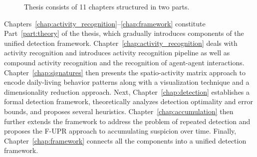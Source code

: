 \begin{figure}[!ht]
\centering
{}
\caption{Thesis consists of 11 chapters structured in two parts.}
\label{fig:thesis-structure}
\end{figure}

Chapters~\ref{chap:activity_recognition}--\ref{chap:framework} constitute Part~\ref{part:theory} of the thesis, which gradually introduces components of the unified detection framework. Chapter~\ref{chap:activity_recognition} deals with activity recognition and introduces activity recognition pipeline as well as compound activity recognition and the recognition of agent-agent interactions. Chapter~\ref{chap:signatures} then presents the spatio-activity matrix approach to encode daily-living behavior patterns along with a visualization technique and a dimensionality reduction approach. Next, Chapter~\ref{chap:detection} establishes a formal detection framework, theoretically analyzes detection optimality and error bounds, and proposes several heuristics. Chapter~\ref{chap:accumulation} then further extends the framework to address the problem of repeated detection and proposes the F-UPR approach to accumulating suspicion over time. Finally, Chapter~\ref{chap:framework} connects all the components into a unified detection framework.

